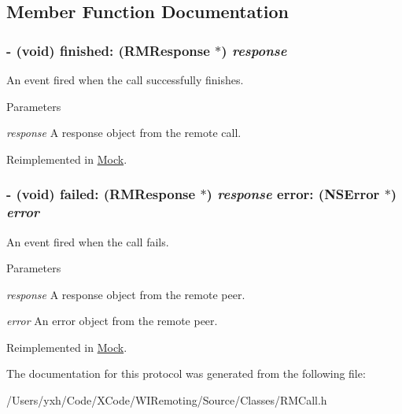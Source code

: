 \subsection{Member Function Documentation}
\hypertarget{protocol_r_m_result_delegate-p_a965fe7cc4e150bb6ecf7cbb02b9c7248}{
\subsubsection[{finished:}]{\setlength{\rightskip}{0pt plus 5cm}-\/ (void) finished: ({\bf RMResponse} $\ast$) {\em response}}}
\label{protocol_r_m_result_delegate-p_a965fe7cc4e150bb6ecf7cbb02b9c7248}


An event fired when the call successfully finishes. 
\begin{DoxyParams}{Parameters}
\item[{\em response}]A response object from the remote call. \end{DoxyParams}


Reimplemented in \hyperlink{interface_mock_ab15e59579bf7b5c5de900d28374062b7}{Mock}.\hypertarget{protocol_r_m_result_delegate-p_a3521cd9555449b32aabdb759d2dadce5}{
\subsubsection[{failed:error:}]{\setlength{\rightskip}{0pt plus 5cm}-\/ (void) failed: ({\bf RMResponse} $\ast$) {\em response}\/ error: (NSError $\ast$) {\em error}}}
\label{protocol_r_m_result_delegate-p_a3521cd9555449b32aabdb759d2dadce5}


An event fired when the call fails. 
\begin{DoxyParams}{Parameters}
\item[{\em response}]A response object from the remote peer. \item[{\em error}]An error object from the remote peer. \end{DoxyParams}


Reimplemented in \hyperlink{interface_mock_ae57e780c8ddcf5c4c79af12c54d58cff}{Mock}.

The documentation for this protocol was generated from the following file:\begin{DoxyCompactItemize}
\item 
/Users/yxh/Code/XCode/WIRemoting/Source/Classes/RMCall.h\end{DoxyCompactItemize}
